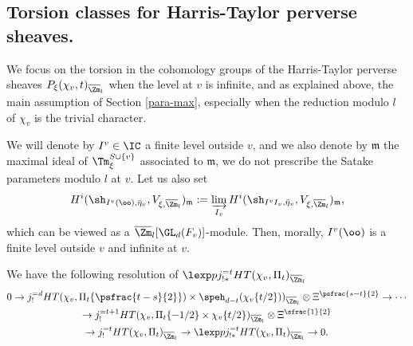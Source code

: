 \subsection{Torsion classes for Harris-Taylor perverse sheaves.}
\label{para-torsion1}

We focus on the torsion in the cohomology groups of the Harris-Taylor perverse
sheaves $P_\xi(\chi_v,t)_{\overline \Zm_l}$ when the level at $v$ is infinite, and as explained above, \cf the main assumption of Section \ref{para-max},
especially when the reduction modulo $l$ of $\chi_v$ is the trivial character.

\begin{nota} \label{nota-mvw}
We will denote by $I^{v} \in \IC$ a finite
level outside $v$, and we also denote by
$\mathfrak m$ the maximal ideal of $\Tm^{S \cup \{v\} }_{\xi}$
associated to $\mathfrak m$, \ie we do not prescribe the Satake
parameters modulo $l$ at $v$.
Let us also set\vspace*{-3pt}
\[
H^i(\sh_{I^v(\oo),\bar \eta_v},V_{\xi,\overline \Zm_l})_{\mathfrak m}:=
\varinjlim_{{I_v}}
H^i(\sh_{I^vI_v,\bar \eta_v},V_{\xi,\overline \Zm_l})_{\mathfrak m},
\]
which can be viewed as a $\overline \Zm_l[\GL_d(F_v)]$-module.
Then, morally, $I^v(\oo)$ is a finite level outside $v$ and infinite at $v$.
\end{nota}

\begin{prop}
We have
the following resolution of $\lexp p j_{!*}^{=t} HT(\chi_{v},\Pi_t)_{\overline \Zm_l}$\vspace*{-3pt}
\begin{multline} \label{eq-resolution0}
0 \to j_!^{=d} HT(\chi_{v},\Pi_t \{\psfrac{t-s}{2}\}) \times
\speh_{d-t}(\chi_{v}\{t/2\}))_{\overline \Zm_l}
\otimes \Xi^{\psfrac{s-t}{2}} \to \cdots \\
\to j_!^{=t+1} HT(\chi_{v},\Pi_t \{-1/2\} \times \chi_{v} \{t/2\})_{\overline \Zm_l}
\otimes \Xi^{\sfrac{1}{2}} \\
\to j_!^{=t} HT(\chi_{v},\Pi_t)_{\overline \Zm_l}
\to \lexp p j_{!*}^{=t} HT(\chi_{v},\Pi_t)_{\overline \Zm_l} \to 0.
\end{multline}
\end{prop}

